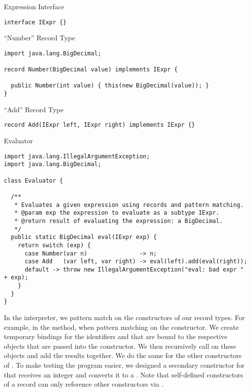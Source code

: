 \begin{cl}[]{Expression Interface}
\begin{lstlisting}[language=MyJava]
interface IExpr {}
\end{lstlisting}
\end{cl}

\begin{cl}[]{``Number'' Record Type}
\begin{lstlisting}[language=MyJava]
import java.lang.BigDecimal;

record Number(BigDecimal value) implements IExpr {
  
  public Number(int value) { this(new BigDecimal(value)); }
}
\end{lstlisting}
\end{cl}

\begin{cl}[]{``Add'' Record Type}
\begin{lstlisting}[language=MyJava]
record Add(IExpr left, IExpr right) implements IExpr {}
\end{lstlisting}
\end{cl}

\begin{cl}[]{Evaluator}
\begin{lstlisting}[language=MyJava]
import java.lang.IllegalArgumentException;
import java.lang.BigDecimal;

class Evaluator {

  /**
   * Evaluates a given expression using records and pattern matching.
   * @param exp the expression to evaluate as a subtype IExpr.
   * @return result of evaluating the expression: a BigDecimal.
   */
  public static BigDecimal eval(IExpr exp) {
    return switch (exp) {
      case Number(var n)               -> n;
      case Add   (var left, var right) -> eval(left).add(eval(right));
      default -> throw new IllegalArgumentException("eval: bad expr " + exp);
    }
  }
}
\end{lstlisting}
\end{cl}

In the interpreter, we pattern match on the constructors of our record types. For example, in the  method, when pattern matching on the  constructor. We create temporary bindings for the identifiers  and  that are bound to the respective  objects that are passed into the constructor. We then recursively call  on these objects and add the results together. We do the same for the other constructors of . To make testing the program easier, we designed a secondary constructor for  that receives an integer and converts it to a . Note that self-defined constructors of a record can only reference other constructors via .

